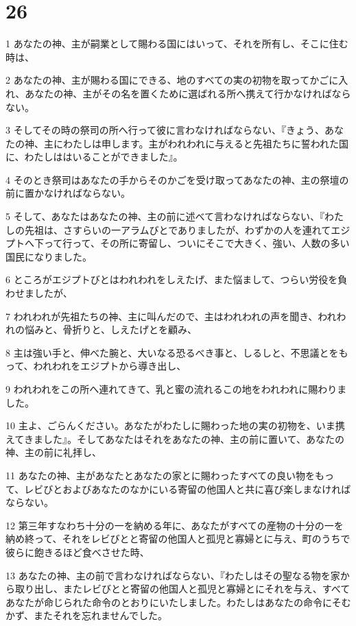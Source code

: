 \chapter{26}

\par 1 あなたの神、主が嗣業として賜わる国にはいって、それを所有し、そこに住む時は、
\par 2 あなたの神、主が賜わる国にできる、地のすべての実の初物を取ってかごに入れ、あなたの神、主がその名を置くために選ばれる所へ携えて行かなければならない。
\par 3 そしてその時の祭司の所へ行って彼に言わなければならない、『きょう、あなたの神、主にわたしは申します。主がわれわれに与えると先祖たちに誓われた国に、わたしははいることができました』。
\par 4 そのとき祭司はあなたの手からそのかごを受け取ってあなたの神、主の祭壇の前に置かなければならない。
\par 5 そして、あなたはあなたの神、主の前に述べて言わなければならない、『わたしの先祖は、さすらいの一アラムびとでありましたが、わずかの人を連れてエジプトへ下って行って、その所に寄留し、ついにそこで大きく、強い、人数の多い国民になりました。
\par 6 ところがエジプトびとはわれわれをしえたげ、また悩まして、つらい労役を負わせましたが、
\par 7 われわれが先祖たちの神、主に叫んだので、主はわれわれの声を聞き、われわれの悩みと、骨折りと、しえたげとを顧み、
\par 8 主は強い手と、伸べた腕と、大いなる恐るべき事と、しるしと、不思議とをもって、われわれをエジプトから導き出し、
\par 9 われわれをこの所へ連れてきて、乳と蜜の流れるこの地をわれわれに賜わりました。
\par 10 主よ、ごらんください。あなたがわたしに賜わった地の実の初物を、いま携えてきました』。そしてあなたはそれをあなたの神、主の前に置いて、あなたの神、主の前に礼拝し、
\par 11 あなたの神、主があなたとあなたの家とに賜わったすべての良い物をもって、レビびとおよびあなたのなかにいる寄留の他国人と共に喜び楽しまなければならない。
\par 12 第三年すなわち十分の一を納める年に、あなたがすべての産物の十分の一を納め終って、それをレビびとと寄留の他国人と孤児と寡婦とに与え、町のうちで彼らに飽きるほど食べさせた時、
\par 13 あなたの神、主の前で言わなければならない、『わたしはその聖なる物を家から取り出し、またレビびとと寄留の他国人と孤児と寡婦とにそれを与え、すべてあなたが命じられた命令のとおりにいたしました。わたしはあなたの命令にそむかず、またそれを忘れませんでした。

